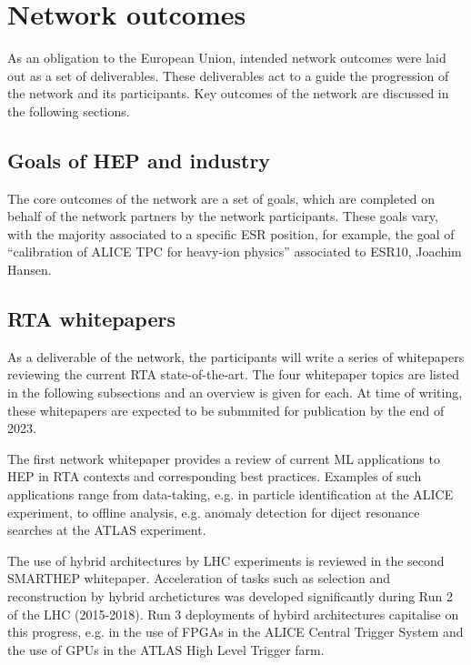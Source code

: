 \section{Network outcomes}
\label{outcomes}
As an obligation to the European Union, intended network outcomes were laid out as a set of deliverables. These deliverables act to a guide the progression of the network and its participants. Key outcomes of the network are discussed in the following sections.

\subsection{Goals of HEP and industry}
\label{goals}
The core outcomes of the network are a set of goals, which are completed on behalf of the network partners by the network participants. These goals vary, with the majority associated to a specific ESR position, for example, the goal of ``calibration of ALICE TPC for heavy-ion physics'' associated to ESR10, Joachim Hansen.

\subsection{RTA whitepapers}
\label{whitepapers}
As a deliverable of the network, the participants will write a series of whitepapers reviewing the current RTA state-of-the-art. The four whitepaper topics are listed in the following subsections and an overview is given for each. At time of writing, these whitepapers are expected to be submmited for publication by the end of 2023.\par

The first network whitepaper provides a review of current ML applications to HEP in RTA contexts and corresponding best practices. Examples of such applications range from data-taking, e.g. in particle identification at the ALICE experiment, to offline analysis, e.g. anomaly detection for diject resonance searches at the ATLAS experiment. \cite{ALICE-PID, ATLAS-dijet}\par

The use of hybrid architectures by LHC experiments is reviewed in the second SMARTHEP whitepaper. Acceleration of tasks such as selection and reconstruction by hybrid archetictures was developed significantly during Run 2 of the LHC (2015-2018). Run 3 deployments of hybird architectures capitalise on this progress, e.g. in the use of FPGAs in the ALICE Central Trigger System and the use of GPUs in the ATLAS High Level Trigger farm. \cite{ALICE-CTS, CMS-HLT-farm}\par 

